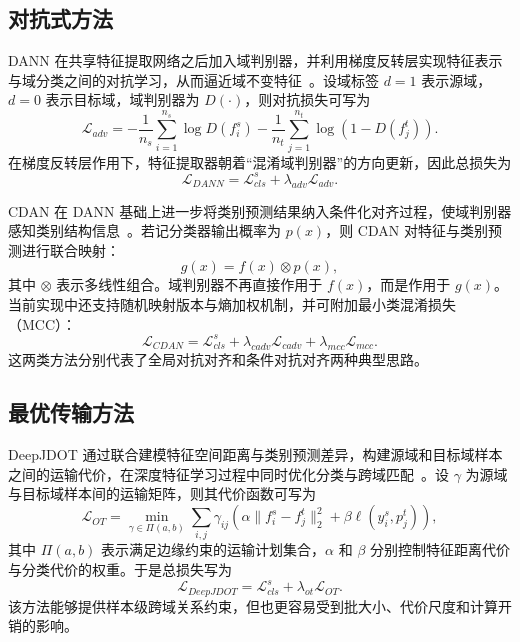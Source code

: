 \subsection{对抗式方法}
DANN 在共享特征提取网络之后加入域判别器，并利用梯度反转层实现特征表示与域分类之间的对抗学习，从而逼近域不变特征~\cite{ganin2016dann}。设域标签 $d=1$ 表示源域，$d=0$ 表示目标域，域判别器为 $D(\cdot)$，则对抗损失可写为
\begin{equation}
\mathcal{L}_{adv}=
-\frac{1}{n_s}\sum_{i=1}^{n_s}\log D(f_i^s)
-\frac{1}{n_t}\sum_{j=1}^{n_t}\log(1-D(f_j^t)).
\end{equation}
在梯度反转层作用下，特征提取器朝着“混淆域判别器”的方向更新，因此总损失为
\begin{equation}
\mathcal{L}_{DANN}=\mathcal{L}_{cls}^s+\lambda_{adv}\mathcal{L}_{adv}.
\end{equation}

CDAN 在 DANN 基础上进一步将类别预测结果纳入条件化对齐过程，使域判别器感知类别结构信息~\cite{long2018conditional}。若记分类器输出概率为 $p(x)$，则 CDAN 对特征与类别预测进行联合映射：
\begin{equation}
g(x)=f(x)\otimes p(x),
\end{equation}
其中 $\otimes$ 表示多线性组合。域判别器不再直接作用于 $f(x)$，而是作用于 $g(x)$。当前实现中还支持随机映射版本与熵加权机制，并可附加最小类混淆损失（MCC）：
\begin{equation}
\mathcal{L}_{CDAN}=
\mathcal{L}_{cls}^s+\lambda_{cadv}\mathcal{L}_{cadv}+\lambda_{mcc}\mathcal{L}_{mcc}.
\end{equation}
这两类方法分别代表了全局对抗对齐和条件对抗对齐两种典型思路。

\subsection{最优传输方法}
DeepJDOT 通过联合建模特征空间距离与类别预测差异，构建源域和目标域样本之间的运输代价，在深度特征学习过程中同时优化分类与跨域匹配~\cite{damodaran2018deepjdot}。设 $\gamma$ 为源域与目标域样本间的运输矩阵，则其代价函数可写为
\begin{equation}
\mathcal{L}_{OT}=
\min_{\gamma\in\Pi(a,b)}
\sum_{i,j}\gamma_{ij}
\left(
\alpha\|f_i^s-f_j^t\|_2^2+
\beta\ell(y_i^s,p_j^t)
\right),
\end{equation}
其中 $\Pi(a,b)$ 表示满足边缘约束的运输计划集合，$\alpha$ 和 $\beta$ 分别控制特征距离代价与分类代价的权重。于是总损失写为
\begin{equation}
\mathcal{L}_{DeepJDOT}=\mathcal{L}_{cls}^s+\lambda_{ot}\mathcal{L}_{OT}.
\end{equation}
该方法能够提供样本级跨域关系约束，但也更容易受到批大小、代价尺度和计算开销的影响。

